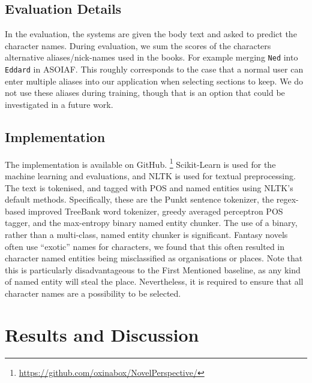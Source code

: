 \documentclass[11pt,a4paper]{article}
\newcommand{\parencite}{\citep}
\begin{document}
\subsection{Evaluation Details}
In the evaluation, the systems are given the body text and asked to predict the character names.
During evaluation, we sum the scores of the characters alternative aliases/nick-names used in the  books.
For example merging \texttt{Ned} into \texttt{Eddard} in ASOIAF.
This roughly corresponds to the case that a normal user can enter multiple aliases into our application when selecting sections to keep.
We do not use these aliases during training, though that is an option that could be investigated in a future work.

\subsection{Implementation}
The implementation is available on GitHub.
\footnote{\url{https://github.com/oxinabox/NovelPerspective/}}
Scikit-Learn \parencite{scikit-learn} is used for the machine learning and evaluations,
and NLTK \parencite{NLTK} is used for textual preprocessing.
The text is tokenised, and tagged with POS and named entities using NLTK's default methods.
Specifically, these are the Punkt sentence tokenizer, the regex-based improved TreeBank word tokenizer, greedy averaged perceptron POS tagger, and the max-entropy binary named entity chunker.
The use of a binary, rather than a multi-class, named entity chunker is significant.
Fantasy novels often use ``exotic'' names for characters, we found that this often resulted in character named entities being misclassified as organisations or places.
Note that this is particularly disadvantageous to the First Mentioned baseline, as any kind of named entity will steal the place.
Nevertheless, it is required to ensure that all character names are a possibility to be selected.


\section{Results and Discussion}\label{sec:results-and-discussion}

\begin{table}
	\begin{adjustbox}{max width=\columnwidth}
		
	\end{adjustbox}
	
	\caption{The results of the character classifier systems. The best results are \textbf{bolded}.
	} \label{tbl:resmain}
\end{table}
\end{document}
